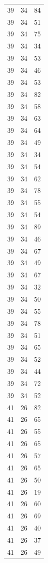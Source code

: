 \documentclass[
  letterpaper,
  DIV=11,
  numbers=noendperiod]{scrreprt}
\renewcommand{\[}{\begin{equation}}
\renewcommand{\]}{\end{equation}}
\begin{document}
\begin{table}
\begin{tabular*}{\linewidth}{@{\extracolsep{\fill}}rrr}
39 & 34 & 84 \\ 
39 & 34 & 51 \\ 
39 & 34 & 75 \\ 
39 & 34 & 34 \\ 
39 & 34 & 53 \\ 
39 & 34 & 46 \\ 
39 & 34 & 53 \\ 
39 & 34 & 82 \\ 
39 & 34 & 58 \\ 
39 & 34 & 63 \\ 
39 & 34 & 64 \\ 
39 & 34 & 49 \\ 
39 & 34 & 34 \\ 
39 & 34 & 54 \\ 
39 & 34 & 62 \\ 
39 & 34 & 78 \\ 
39 & 34 & 55 \\ 
39 & 34 & 54 \\ 
39 & 34 & 89 \\ 
39 & 34 & 46 \\ 
39 & 34 & 67 \\ 
39 & 34 & 49 \\ 
39 & 34 & 67 \\ 
39 & 34 & 32 \\ 
39 & 34 & 50 \\ 
39 & 34 & 55 \\ 
39 & 34 & 78 \\ 
39 & 34 & 51 \\ 
39 & 34 & 65 \\ 
39 & 34 & 52 \\ 
39 & 34 & 44 \\ 
39 & 34 & 72 \\ 
39 & 34 & 52 \\ 
41 & 26 & 82 \\ 
41 & 26 & 65 \\ 
41 & 26 & 55 \\ 
41 & 26 & 65 \\ 
41 & 26 & 57 \\ 
41 & 26 & 65 \\ 
41 & 26 & 50 \\ 
41 & 26 & 19 \\ 
41 & 26 & 60 \\ 
41 & 26 & 69 \\ 
41 & 26 & 40 \\ 
41 & 26 & 37 \\ 
41 & 26 & 49 \\ 

\end{tabular*}
\end{table}
\end{document}
